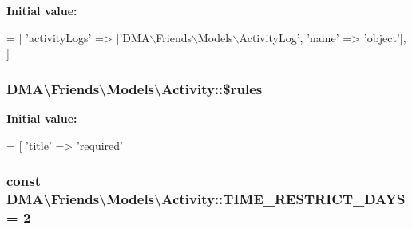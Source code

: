 {\bfseries Initial value\-:}
\begin{DoxyCode}
= [ 
        \textcolor{stringliteral}{'activityLogs'}  => [\textcolor{stringliteral}{'DMA\(\backslash\)Friends\(\backslash\)Models\(\backslash\)ActivityLog'}, \textcolor{stringliteral}{'name'} => \textcolor{stringliteral}{'object'}],
    ]
\end{DoxyCode}
\hypertarget{classDMA_1_1Friends_1_1Models_1_1Activity_a0b92e75aa8d92e2d3c9b24f54cd813bc}{
\subsubsection[{\$rules}]{\setlength{\rightskip}{0pt plus 5cm}D\-M\-A\textbackslash{}\-Friends\textbackslash{}\-Models\textbackslash{}\-Activity\-::\$rules}}\label{classDMA_1_1Friends_1_1Models_1_1Activity_a0b92e75aa8d92e2d3c9b24f54cd813bc}
{\bfseries Initial value\-:}
\begin{DoxyCode}
= [ 
        \textcolor{stringliteral}{'title'} => \textcolor{stringliteral}{'required'}
\end{DoxyCode}
\hypertarget{classDMA_1_1Friends_1_1Models_1_1Activity_a71b85478f20cda144aeffe010364a0f7}{
\subsubsection[{T\-I\-M\-E\-\_\-\-R\-E\-S\-T\-R\-I\-C\-T\-\_\-\-D\-A\-Y\-S}]{\setlength{\rightskip}{0pt plus 5cm}const D\-M\-A\textbackslash{}\-Friends\textbackslash{}\-Models\textbackslash{}\-Activity\-::\-T\-I\-M\-E\-\_\-\-R\-E\-S\-T\-R\-I\-C\-T\-\_\-\-D\-A\-Y\-S = 2}}\label{classDMA_1_1Friends_1_1Models_1_1Activity_a71b85478f20cda144aeffe010364a0f7}
